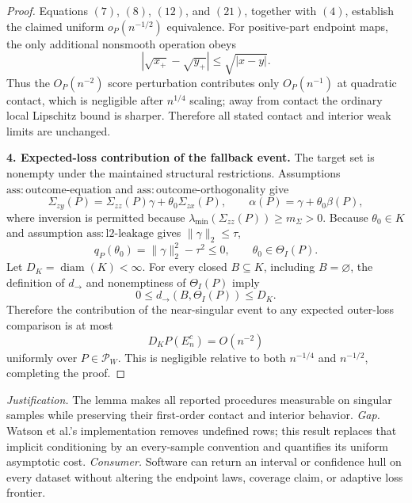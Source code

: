 \documentclass{article}
\begin{document}
\begin{proof}
Equations \((7)\), \((8)\), \((12)\), and \((21)\), together with \((4)\), establish the claimed uniform \(o_P(n^{-1/2})\) equivalence. For positive-part endpoint maps, the only additional nonsmooth operation obeys
\[
 |\sqrt{x_+}-\sqrt{y_+}|\leq\sqrt{|x-y|}.
\]
Thus the \(O_P(n^{-2})\) score perturbation contributes only \(O_P(n^{-1})\) at quadratic contact, which is negligible after \(n^{1/4}\) scaling; away from contact the ordinary local Lipschitz bound is sharper. Therefore all stated contact and interior weak limits are unchanged.

\textbf{4. Expected-loss contribution of the fallback event.}
The target set is nonempty under the maintained structural restrictions. Assumptions \(\mathrm{ass:outcome\mbox{-}equation}\) and \(\mathrm{ass:outcome\mbox{-}orthogonality}\) give
\[
 \Sigma_{zy}(P)=\Sigma_{zz}(P)\gamma+\theta_0\Sigma_{zx}(P),
 \qquad
 \alpha(P)=\gamma+\theta_0\beta(P),
\]
where inversion is permitted because \(\lambda_{\min}(\Sigma_{zz}(P))\geq m_{\Sigma}>0\). Because \(\theta_0\in K\) and assumption \(\mathrm{ass:l2\mbox{-}leakage}\) gives \(\|\gamma\|_2\leq\tau\),
\[
 q_P(\theta_0)=\|\gamma\|_2^2-\tau^2\leq0,
 \qquad
 \theta_0\in\Theta_I(P).
\]
Let \(D_K=\operatorname{diam}(K)<\infty\). For every closed \(B\subseteq K\), including \(B=\varnothing\), the definition of \(d_{\to}\) and nonemptiness of \(\Theta_I(P)\) imply
\[
 0\leq d_{\to}(B,\Theta_I(P))\leq D_K.
\]
Therefore the contribution of the near-singular event to any expected outer-loss comparison is at most
\[
 D_KP(E_n^c)=O(n^{-2})
\]
uniformly over \(P\in\mathcal P_W\). This is negligible relative to both \(n^{-1/4}\) and \(n^{-1/2}\), completing the proof.
\end{proof}
\par\smallskip\noindent \textit{Justification.} The lemma makes all reported procedures measurable on singular samples while preserving their first-order contact and interior behavior. \textit{Gap.} Watson et al.'s implementation removes undefined rows; this result replaces that implicit conditioning by an every-sample convention and quantifies its uniform asymptotic cost. \textit{Consumer.} Software can return an interval or confidence hull on every dataset without altering the endpoint laws, coverage claim, or adaptive loss frontier.
\end{document}
